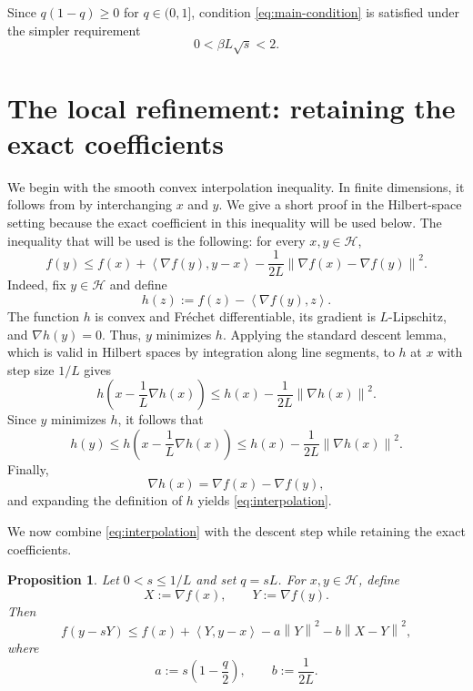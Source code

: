 \documentclass[11pt]{article}
\theoremstyle{plain}
\newtheorem{proposition}[theorem]{Proposition}
\theoremstyle{definition}
\newcommand{\Hc}{\mathcal H}
\newcommand{\norm}[1]{\left\lVert #1\right\rVert}
\newcommand{\inner}[2]{\left\langle #1,#2\right\rangle}
\begin{document}
Since $q(1-q)\geq0$ for $q\in(0,1]$, condition \eqref{eq:main-condition} is satisfied under the simpler requirement
\begin{equation}
\label{eq:simple-condition-intro}
0<\beta L\sqrt{s}<2.
\end{equation}
\section{The local refinement: retaining the exact coefficients} \label{sec:local-estimate}
We begin with the smooth convex interpolation inequality. In finite dimensions, it follows from
\cite[Theorem~2.1.5, inequality~(2.1.7)]{Nesterov} by interchanging $x$ and $y$. We give a short proof in the Hilbert-space setting because
the exact coefficient in this inequality will be used below. The inequality that will be used is the following: for every $x,y\in\Hc$,
\begin{equation}
\label{eq:interpolation}
f(y)\leq f(x)+\inner{\nabla f(y)}{y-x}
-\frac{1}{2L}\norm{\nabla f(x)-\nabla f(y)}^2.
\end{equation}
Indeed, fix $y\in\Hc$ and define
$$
h(z):=f(z)-\inner{\nabla f(y)}{z}.
$$
The function $h$ is convex and Fr\'echet differentiable, its gradient is
$L$-Lipschitz, and $
\nabla h(y)=0.$
Thus, $y$ minimizes $h$. {Applying the standard descent lemma, which is valid in Hilbert spaces by integration along line segments, to $h$ at $x$
with step size $1/L$ gives}
$$
h\left(x-\frac{1}{L}\nabla h(x)\right)
\leq h(x)-\frac{1}{2L}\norm{\nabla h(x)}^2.
$$
Since $y$ minimizes $h$, it follows that
$$
h(y)\leq
h\left(x-\frac{1}{L}\nabla h(x)\right)
\leq h(x)-\frac{1}{2L}\norm{\nabla h(x)}^2.
$$
Finally,
$$
\nabla h(x)=\nabla f(x)-\nabla f(y),
$$
and expanding the definition of $h$ yields \eqref{eq:interpolation}.

We now combine \eqref{eq:interpolation} with the descent step while retaining the exact coefficients.

\begin{proposition}
\label{prop:gradient-step}
Let $0<s\leq1/L$ and set $q=sL$. For $x,y\in\Hc$, define
$$
X:=\nabla f(x),
\qquad
Y:=\nabla f(y).
$$
Then
\begin{equation}
\label{eq:gradient-step}
f(y-sY)
\leq f(x)+\inner{Y}{y-x}
-a\norm{Y}^2-b\norm{X-Y}^2,
\end{equation}
where
\begin{equation}
\label{eq:ab}
a:=s\left(1-\frac q2\right),
\qquad
b:=\frac{1}{2L}.
\end{equation}
\end{proposition}
\end{document}
